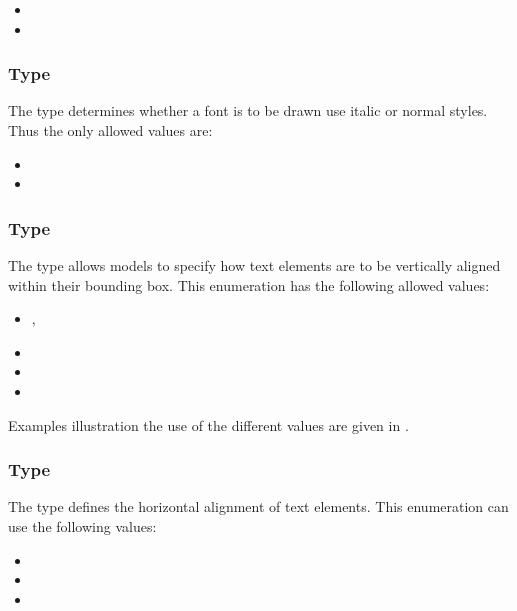 \begin{itemize}
 \item {} 
 \item {} 
\end{itemize}

\subsubsection{Type \fixttspace{}}

The type \FontStyle determines whether a font is to be
drawn use italic or normal styles. Thus the only allowed values are:

\begin{itemize}
 \item {} 
 \item {} 
\end{itemize}

\subsubsection{Type \fixttspace{}}

The type \VTextAnchor allows models to specify how text elements are to be
vertically aligned within their bounding box. This enumeration has the following allowed values: 

\begin{itemize}
 \item {},
 \item {}
 \item {} 
 \item {}
\end{itemize}

Examples illustration the use of the different \VTextAnchor values are given in .

\subsubsection{Type \fixttspace{}}

The type \HTextAnchor defines the horizontal alignment of text elements. This enumeration can use the following values: 

\begin{itemize}
 \item {}
 \item {}
 \item {}
\end{itemize}

